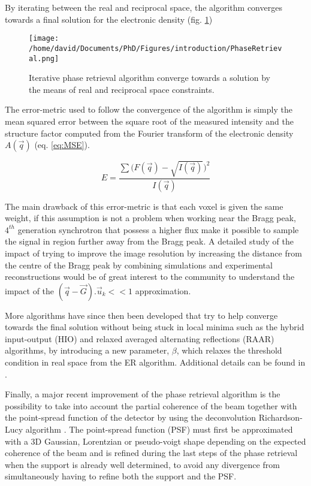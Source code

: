 By iterating between the real and reciprocal space, the algorithm converges towards a final solution for the electronic density (fig. \ref{fig:PRAlgo})

\begin{figure}[!htb]
   \centering
   \texttt{[image: /home/david/Documents/PhD/Figures/introduction/PhaseRetrieval.png]}
   \caption{
   Iterative phase retrieval algorithm converge towards a solution by the means of real and reciprocal space constraints.
   }
   \label{fig:PRAlgo}
\end{figure}

The error-metric used to follow the convergence of the algorithm is simply the mean squared error between the square root of the measured intensity and the structure factor computed from the Fourier transform of the electronic density $A(\vec{q})$ (eq. \ref{eq:MSE}).

\begin{equation}
    \label{eq:MSE}
    E = \frac{\sum \big( F(\vec{q}) - \sqrt{I(\vec{q})}  \big)^2}{I(\vec{q})}
\end{equation}

The main drawback of this error-metric is that each voxel is given the same weight, if this assumption is not a problem when working near the Bragg peak, $4^{th}$ generation synchrotron that possess a higher flux make it possible to sample the signal in region further away from the Bragg peak.
A detailed study of the impact of trying to improve the image resolution by increasing the distance from the centre of the Bragg peak by combining simulations and experimental reconstructions would be of great interest to the community to understand the impact of the $(\vec{q}-\vec{G}).\vec{u}_k<<1$ approximation.

More algorithms have since then been developed that try to help converge towards the final solution without being stuck in local minima such as the hybrid input-output (HIO) and relaxed averaged alternating reflections (RAAR) algorithms, by introducing a new parameter, $\beta$, which relaxes the threshold condition in real space from the ER algorithm.
Additional details can be found in \cite{Marchesini2003, Luke2005, Marchesini2007}.

Finally, a major recent improvement of the phase retrieval algorithm is the possibility to take into account the partial coherence of the beam \parencite{Sinha1998, Vartanyants2001, Williams2007, Whitehead2009, Nugent2010, ChenBo2012} together with the point-spread function of the detector by using the deconvolution Richardson-Lucy algorithm \parencite{Richardson1972, Lucy1974, Fish1995, Clark2012}.
The point-spread function (PSF) must first be approximated with a 3D Gaussian, Lorentzian or pseudo-voigt shape depending on the expected coherence of the beam and is refined during the last steps of the phase retrieval when the support is already well determined, to avoid any divergence from simultaneously having to refine both the support and the PSF.

